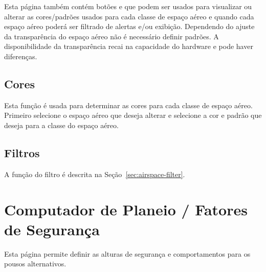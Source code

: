 Esta página também contém botões   e  que podem ser usados para visualizar ou alterar as cores/padrões usados para cada classe de espaço aéreo e quando cada espaço aéreo poderá ser filtrado de alertas e/ou exibição.  Dependendo do ajuste da transparência do espaço aéreo não é necessário definir padrões.  A disponibilidade da transparência recai na capacidade do hardware e pode haver diferenças.

\subsection*{Cores}
Esta função é usada para determinar as cores para cada classe de espaço aéreo.  Primeiro selecione o espaço aéreo que deseja alterar e selecione a cor e padrão que deseja para a classe do espaço aéreo.

\subsection*{Filtros}
A função do filtro é descrita na Seção~\ref{sec:airspace-filter}.


\section{Computador de Planeio / Fatores de Segurança}

Esta página permite definir as alturas de segurança e comportamentos para os pousos alternativos.

